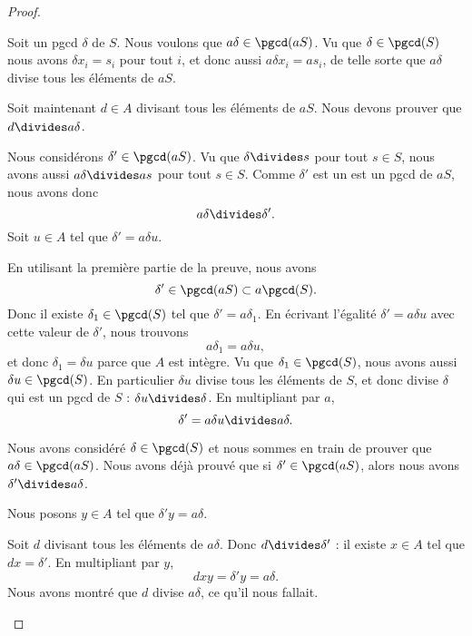 \begin{proof}
\begin{subproof}
		Soit un pgcd \( \delta\) de \( S\). Nous voulons que \( a\delta\in \pgcd(aS)\). Vu que \( \delta\in\pgcd(S)\) nous avons \( \delta x_i=s_i\) pour tout \( i\), et donc aussi \( a\delta x_i=as_i\), de telle sorte que \( a\delta\) divise tous les éléments de \( aS\).

		Soit maintenant \( d\in A\) divisant tous les éléments de \( aS\). Nous devons prouver que \( d\divides a\delta\).

		\begin{subproof}

			Nous considérons \( \delta'\in \pgcd(aS)\). Vu que \( \delta\divides s\) pour tout \( s\in S\), nous avons aussi \( a\delta\divides as\) pour tout \( s\in S\). Comme \( \delta'\) est un est un pgcd de \( aS\), nous avons donc
			\begin{equation}
				a\delta\divides\delta'.
			\end{equation}
			Soit \( u\in A\) tel que \( \delta'=a\delta u\).

			En utilisant la première partie de la preuve, nous avons
			\begin{equation}
				\delta'\in\pgcd(aS)\subset a\pgcd(S).
			\end{equation}
			Donc il existe \( \delta_1\in\pgcd(S)\) tel que \( \delta'=a\delta_1\). En écrivant l'égalité \( \delta' =a\delta u\) avec cette valeur de \( \delta'\), nous trouvons
			\begin{equation}		\label{EQooVHSSooDdVUeW}
				a\delta_1=a\delta u,
			\end{equation}
			et donc \( \delta_1=\delta u\) parce que \( A\) est intègre. Vu que \( \delta_1\in\pgcd(S)\), nous avons aussi \( \delta u\in\pgcd(S)\). En particulier \( \delta u\) divise tous les éléments de \( S\), et donc divise \( \delta\) qui est un pgcd de \( S\) : \( \delta u\divides \delta\). En multipliant par \( a\),
			\begin{equation}
				\delta'=a\delta u\divides a \delta.
			\end{equation}

			\spitem[Résumé]
			Nous avons considéré \( \delta\in\pgcd(S)\) et nous sommes en train de prouver que \( a\delta\in\pgcd(aS)\). Nous avons déjà prouvé que si \( \delta'\in \pgcd(aS)\), alors nous avons \( \delta'\divides a\delta\).

			Nous posons \( y\in A\) tel que \( \delta' y=a\delta\).

			\spitem[Et enfin]
			Soit \( d\) divisant tous les éléments de \( a\delta\). Donc \( d\divides \delta'\) : il existe \( x\in A\) tel que \( dx=\delta'\). En multipliant par \( y\),
			\begin{equation}
				dxy=\delta' y=a\delta.
			\end{equation}
			Nous avons montré que \( d\) divise \( a\delta\), ce qu'il nous fallait.
		\end{subproof}
	\end{subproof}
\end{proof}

